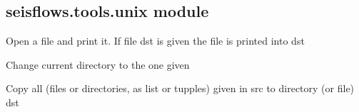 \documentclass[letterpaper,10pt,english]{sphinxmanual}
\begin{document}
\begin{fulllineitems}
\label{\detokenize{ref/seisflows.tools:seisflows.tools.tools.timestamp}}
\end{fulllineitems}



\subsection{seisflows.tools.unix module}
\label{\detokenize{ref/seisflows.tools:module-seisflows.tools.unix}}\label{\detokenize{ref/seisflows.tools:seisflows-tools-unix-module}}

\begin{fulllineitems}
\label{\detokenize{ref/seisflows.tools:seisflows.tools.unix.cat}}
Open a file and print it. If file dst is given the file is printed into
dst

\end{fulllineitems}


\begin{fulllineitems}
\label{\detokenize{ref/seisflows.tools:seisflows.tools.unix.cd}}
Change current directory to the one given

\end{fulllineitems}


\begin{fulllineitems}
\label{\detokenize{ref/seisflows.tools:seisflows.tools.unix.cp}}
Copy all (files or directories, as list or tupples) given in src to
directory (or file) dst

\end{fulllineitems}
\end{document}
